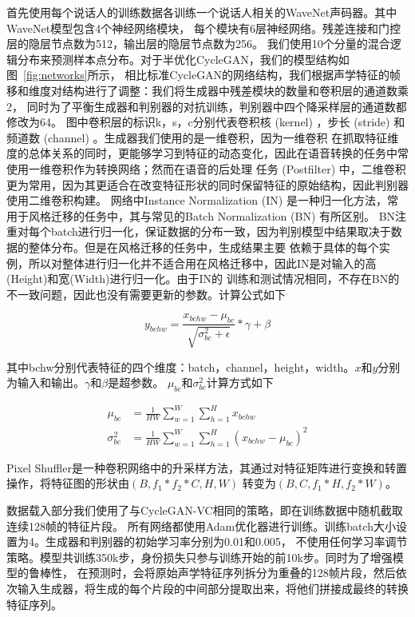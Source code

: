 首先使用每个说话人的训练数据各训练一个说话人相关的WaveNet声码器。其中WaveNet模型包含4个神经网络模块，
每个模块有6层神经网络。残差连接和门控层的隐层节点数为512，输出层的隐层节点数为256。
我们使用10个分量的混合逻辑分布来预测样本点分布。对于半优化CycleGAN，我们的模型结构如图~\ref{fig:networks}所示，
相比标准CycleGAN的网络结构，我们根据声学特征的帧移和维度对结构进行了调整：我们将生成器中残差模块的数量和卷积层的通道数乘2，
同时为了平衡生成器和判别器的对抗训练，判别器中四个降采样层的通道数都修改为64。
图中卷积层的标识k，s，c分别代表卷积核 (kernel) ，步长 (stride) 和频道数 (channel) 。生成器我们使用的是一维卷积，因为一维卷积
在抓取特征维度的总体关系的同时，更能够学习到特征的动态变化，因此在语音转换的任务中常使用一维卷积作为转换网络；然而在语音的后处理
任务 (Postfilter) 中，二维卷积更为常用，因为其更适合在改变特征形状的同时保留特征的原始结构，因此判别器使用二维卷积构建。
网络中Instance Normalization (IN) 是一种归一化方法，常用于风格迁移的任务中，其与常见的Batch Normalization (BN) 有所区别。
BN注重对每个batch进行归一化，保证数据的分布一致，因为判别模型中结果取决于数据的整体分布。但是在风格迁移的任务中，生成结果主要
依赖于具体的每个实例，所以对整体进行归一化并不适合用在风格迁移中，因此IN是对输入的高(Height)和宽(Width)进行归一化。由于IN的
训练和测试情况相同，不存在BN的不一致问题，因此也没有需要更新的参数。计算公式如下

\begin{equation}
    y_{bchw} = \frac{x_{bchw}-\mu_{bc}}{\sqrt{\sigma^2_{bc}+\epsilon}} * \gamma + \beta
\end{equation}

其中bchw分别代表特征的四个维度：batch，channel，height，width。$x$和$y$分别为输入和输出。$\gamma$和$\beta$是超参数。
$\mu_{bc}$和$\sigma^2_{bc}$计算方式如下

\begin{align}
    \mu_{bc} & = \frac{1}{HW}\sum^W_{w=1}\sum^H_{h=1}x_{bchw} \\
    \sigma^2_{bc} & = \frac{1}{HW}\sum^W_{w=1}\sum^H_{h=1}(x_{bchw}-\mu_{bc})^2
\end{align}

Pixel Shuffler是一种卷积网络中的升采样方法，其通过对特征矩阵进行变换和转置操作，将特征图的形状由$(B,f_1 * f_2 * C,H,W)$
转变为$(B,C,f_1 *H,f_2 *W)$。

数据载入部分我们使用了与CycleGAN-VC相同的策略，即在训练数据中随机截取连续128帧的特征片段。
所有网络都使用Adam优化器进行训练。训练batch大小设置为4。生成器和判别器的初始学习率分别为0.01和0.005，
不使用任何学习率调节策略。模型共训练350k步，身份损失只参与训练开始的前10k步。同时为了增强模型的鲁棒性，
在预测时，会将原始声学特征序列拆分为重叠的128帧片段，然后依次输入生成器，将生成的每个片段的中间部分提取出来，将他们拼接成最终的转换特征序列。

